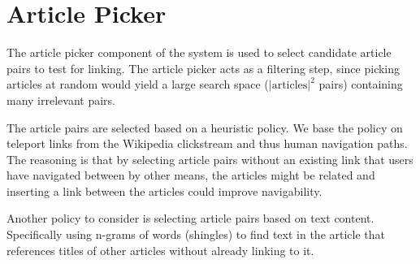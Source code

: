 \section{Article Picker}
The article picker component of the system is used to select candidate article pairs to test for linking. The article picker acts as a filtering step, since picking articles at random would yield a large search space ($\left\vert{\text{articles}}\right\vert ^{2}$ pairs) containing many irrelevant pairs.

The article pairs are selected based on a heuristic policy. We base the policy on teleport links  from the Wikipedia clickstream and thus human navigation paths. The reasoning is that by selecting article pairs without an existing link that users have navigated between by other means, the articles might be related and inserting a link between the articles could improve navigability.

Another policy to consider is selecting article pairs based on text content. Specifically using n-grams of words (shingles) to find text in the article that references titles of other articles without already linking to it. 


